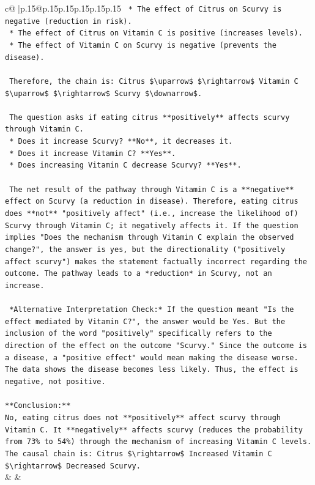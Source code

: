\documentclass{article}
\begin{document}
{\begin{supertabular}{c@{$\;$}|p{.15\linewidth}@{}p{.15\linewidth}p{.15\linewidth}p{.15\linewidth}p{.15\linewidth}p{.15\linewidth}}
{{{\texttt{    *   The effect of Citrus on Scurvy is negative (reduction in risk).} \\
\texttt{    *   The effect of Citrus on Vitamin C is positive (increases levels).} \\
\texttt{    *   The effect of Vitamin C on Scurvy is negative (prevents the disease).} \\
\\ 
\texttt{    Therefore, the chain is: Citrus \$\textbackslash{}uparrow\$ \$\textbackslash{}rightarrow\$ Vitamin C \$\textbackslash{}uparrow\$ \$\textbackslash{}rightarrow\$ Scurvy \$\textbackslash{}downarrow\$.} \\
\\ 
\texttt{    The question asks if eating citrus **positively** affects scurvy through Vitamin C.} \\
\texttt{    *   Does it increase Scurvy? **No**, it decreases it.} \\
\texttt{    *   Does it increase Vitamin C? **Yes**.} \\
\texttt{    *   Does increasing Vitamin C decrease Scurvy? **Yes**.} \\
\\ 
\texttt{    The net result of the pathway through Vitamin C is a **negative** effect on Scurvy (a reduction in disease). Therefore, eating citrus does **not** "positively affect" (i.e., increase the likelihood of) Scurvy through Vitamin C; it negatively affects it. If the question implies "Does the mechanism through Vitamin C explain the observed change?", the answer is yes, but the directionality ("positively affect scurvy") makes the statement factually incorrect regarding the outcome. The pathway leads to a *reduction* in Scurvy, not an increase.} \\
\\ 
\texttt{    *Alternative Interpretation Check:* If the question meant "Is the effect mediated by Vitamin C?", the answer would be Yes. But the inclusion of the word "positively" specifically refers to the direction of the effect on the outcome "Scurvy." Since the outcome is a disease, a "positive effect" would mean making the disease worse. The data shows the disease becomes less likely. Thus, the effect is negative, not positive.} \\
\\ 
\texttt{**Conclusion:**} \\
\texttt{No, eating citrus does not **positively** affect scurvy through Vitamin C. It **negatively** affects scurvy (reduces the probability from 73\% to 54\%) through the mechanism of increasing Vitamin C levels. The causal chain is: Citrus \$\textbackslash{}rightarrow\$ Increased Vitamin C \$\textbackslash{}rightarrow\$ Decreased Scurvy.} \\
            }
        }
    }
    & & \\ \\


\end{supertabular}}
\end{document}
